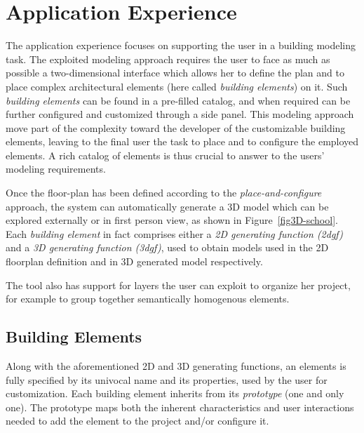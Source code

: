 \section{Application Experience}\label{sec:application}

The application experience focuses on supporting the user in a building modeling task. The exploited modeling approach requires the user to face as much as possible a two-dimensional interface which allows her to define the plan and to place complex architectural elements (here called \emph{building elements}) on it. Such \emph{building elements} can be found in a pre-filled catalog, and when required can be further configured and customized through a side panel. This modeling approach move part of the complexity toward the developer of the customizable building elements, leaving to the final user the task to place and to configure the employed elements. A rich catalog of elements is thus crucial to answer to the users' modeling requirements.

Once the floor-plan has been defined according to the \emph{place-and-configure} approach, the system can automatically generate a 3D model which can be explored externally or in first person view, as shown in Figure~\ref{fig3D-school}. Each  \emph{building element} in fact comprises either a \emph{2D generating function (2dgf)} and a \emph{3D generating function (3dgf)}, used to obtain models used in the 2D floorplan definition and in 3D generated model respectively.

The tool also has support for layers the user can exploit to organize her project, for example to group together semantically homogenous elements.

\subsection{Building Elements}\label{ssec:elements}

Along with the aforementioned 2D and 3D generating functions, an elements is fully specified by its univocal name and its properties, used by the user for customization. Each building element inherits from its \emph{prototype} (one and only one). The prototype maps both the inherent characteristics and user interactions needed to add the element to the project and/or configure it.

